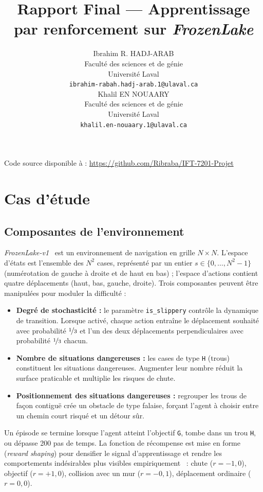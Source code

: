 \documentclass{article}
\title{Rapport Final --- Apprentissage par renforcement sur \textit{FrozenLake}}
\author{
  Ibrahim R. HADJ-ARAB \\
  Faculté des sciences et de génie\\
  Université Laval\\
  \texttt{ibrahim-rabah.hadj-arab.1@ulaval.ca} \\
  \And
  Khalil EN NOUAARY \\
  Faculté des sciences et de génie\\
  Université Laval\\
  \texttt{khalil.en-nouaary.1@ulaval.ca} \\
}
\begin{document}
\maketitle

\noindent Code source disponible à : \url{https://github.com/Ribraba/IFT-7201-Projet}

\section{Cas d'étude}

\subsection{Composantes de l'environnement}

\textit{FrozenLake-v1}~\citep{towers2024} est un environnement de navigation en grille $N \times N$. L'espace d'états est l'ensemble des $N^2$ cases, représenté par un entier $s \in \{0, \ldots, N^2-1\}$ (numérotation de gauche à droite et de haut en bas) ; l'espace d'actions contient quatre déplacements (haut, bas, gauche, droite). Trois composantes peuvent être manipulées pour moduler la difficulté :

\begin{itemize}
  \item \textbf{Degré de stochasticité :} le paramètre \texttt{is\_slippery} contrôle la dynamique de transition. Lorsque activé, chaque action entraîne le déplacement souhaité avec probabilité $\nicefrac{1}{3}$ et l'un des deux déplacements perpendiculaires avec probabilité $\nicefrac{1}{3}$ chacun.
  \item \textbf{Nombre de situations dangereuses :} les cases de type \texttt{H} (trous) constituent les situations dangereuses. Augmenter leur nombre réduit la surface praticable et multiplie les risques de chute.
  \item \textbf{Positionnement des situations dangereuses :} regrouper les trous de façon contiguë crée un obstacle de type falaise, forçant l'agent à choisir entre un chemin court risqué et un détour sûr.
\end{itemize}

Un épisode se termine lorsque l'agent atteint l'objectif \texttt{G}, tombe dans un trou \texttt{H}, ou dépasse 200 pas de temps. La fonction de récompense est mise en forme (\textit{reward shaping}) pour densifier le signal d'apprentissage et rendre les comportements indésirables plus visibles empiriquement~\citep{ng1999} : chute ($r = -1{,}0$), objectif ($r = +1{,}0$), collision avec un mur ($r = -0{,}1$), déplacement ordinaire ($r = 0{,}0$).
\end{document}
